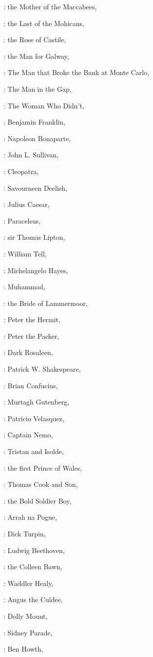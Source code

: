 :
the Mother of the Maccabees,

:
the Last of the Mohicans,

:
the Rose of Castile,

:
the Man for Galway,

:
The Man that Broke the Bank at Monte Carlo,

:
The Man in the Gap,

:
The Woman Who Didn't,

:
Benjamin Franklin,

:
Napoleon Bonaparte,

:
John L. Sullivan,

:
Cleopatra,

:
Savourneen Deelish,

:
Julius Caesar,

:
Paracelsus,

:
sir Thomas Lipton,

:
William Tell,

:
Michelangelo Hayes,

:
Muhammad,

:
the Bride of Lammermoor,

:
Peter the Hermit,

:
Peter the Packer,

:
Dark Rosaleen,

:
Patrick W. Shakespeare,

:
Brian Confucius,

:
Murtagh Gutenberg,

:
Patricio Velasquez,

:
Captain Nemo,

:
Tristan and Isolde,

:
the first Prince of Wales,

:
Thomas Cook and Son,

:
the Bold Soldier Boy,

:
Arrah na Pogue,

:
Dick Turpin,

:
Ludwig Beethoven,

:
the Colleen Bawn,

:
Waddler Healy,

:
Angus the Culdee,

:
Dolly Mount,

:
Sidney Parade,

:
Ben Howth,

